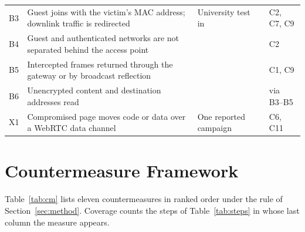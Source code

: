 \documentclass[conference]{IEEEtran}
\begin{document}
\begin{table}[t]
\begin{tabularx}{\textwidth}{@{}L{0.5cm}YL{3.8cm}L{2.7cm}@{}}
B3 & Guest joins with the victim's MAC address; downlink traffic is redirected & University test in~\cite{airsnitch2026} & C2, C7, C9 \\
B4 & Guest and authenticated networks are not separated behind the access point & \cite{airsnitch2026} & C2 \\
B5 & Intercepted frames returned through the gateway or by broadcast reflection & \cite{airsnitch2026} & C1, C9 \\
B6 & Unencrypted content and destination addresses read & \cite{airsnitch2026} & via B3--B5 \\
\addlinespace
X1 & Compromised page moves code or data over a WebRTC data channel & One reported campaign~\cite{sansec2026} & C6, C11 \\
\bottomrule
\end{tabularx}
\end{table}

\section{Countermeasure Framework}
\label{sec:framework}
Table~\ref{tab:cm} lists eleven countermeasures in ranked order under the rule of Section~\ref{sec:method}. Coverage counts the steps of Table~\ref{tab:steps} in whose last column the measure appears.
\end{document}
